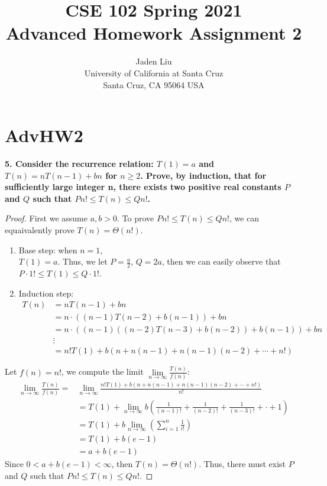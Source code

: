 \documentclass[12pt]{article}
\begin{document}
\title{ CSE 102 Spring 2021\\
	Advanced Homework Assignment 2}

\author{Jaden Liu \\ 
University of California at Santa Cruz\\
Santa Cruz, CA 95064 USA }

\maketitle


\section{AdvHW2} 

\textbf{5. Consider the recurrence relation: $T(1)=a$ and $T(n)=nT(n-1)+bn$
	for $n\ge2$. Prove, by induction, that for sufficiently large integer n, there
	exists two positive real constants $P$ and $Q$ such that $Pn!\le T(n)\le Qn!$.}\\
\begin{proof}
	First we assume $a,b>0$. To prove $Pn!\le T(n)\le Qn!$, we can equaivalently prove $T(n)=\Theta(n!)$.\\
	\begin{enumerate}
		\item Base step: when $n=1$,\\
			$T(1)=a$. Thus, we let $P=\frac{a}{2}$, $Q=2a$, then we can easily observe that $P\cdot1!\le T(1)\le Q\cdot1!$.
		\item Induction step:\\
			\begin{align*}
				T(n)&=nT(n-1)+bn\\
				&=n\cdot((n-1)T(n-2)+b(n-1))+bn\\
				&=n\cdot((n-1)((n-2)T(n-3)+b(n-2))+b(n-1))+bn\\
				&\vdots\\
				&=n!T(1)+b(n+n(n-1)+n(n-1)(n-2)+\cdots+n!)
			\end{align*}
	\end{enumerate}
	Let $f(n)=n!$, we compute the limit $\lim\limits_{n\to\infty}\frac{T(n)}{f(n)}$:
	\begin{align*}
		\lim\limits_{n\to\infty}\frac{T(n)}{f(n)}=&\lim\limits_{n\to\infty}\frac{n!T(1)+b(n+n(n-1)+n(n-1)(n-2)+\cdots+n!)}{n!}\\
		&=T(1)+\lim\limits_{n\to\infty}b(\frac{1}{(n-1)!}+\frac{1}{(n-2)!}+\frac{1}{(n-3)!}+\cdot+1)\\
		&=T(1)+b\lim\limits_{n\to\infty}(\sum_{i=1}^{n}\frac{1}{i!})\\
		&=T(1)+b(e-1)\\
		&=a+b(e-1)
	\end{align*}
	Since $0<a+b(e-1)<\infty$, then $T(n)=\Theta(n!)$. Thus, there must exist $P$ and $Q$ such that $Pn!\le T(n)\le Qn!$.
\end{proof}



\bigskip


\begin{thebibliography}{}
\end{thebibliography}
\end{document}
